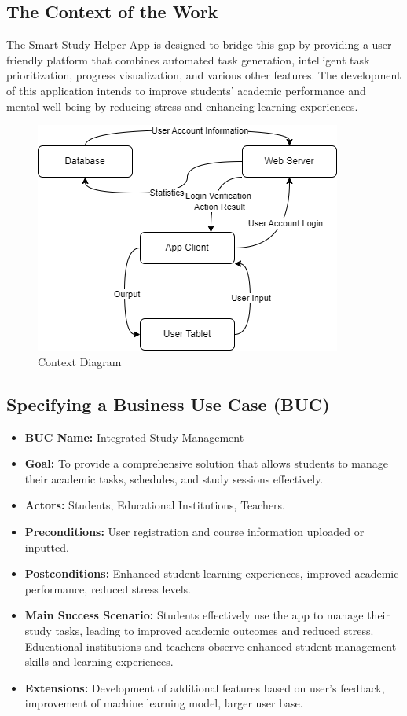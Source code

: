 \documentclass[12pt]{article}
\begin{document}
\subsection{The Context of the Work}
The Smart Study Helper App is designed to bridge this gap by providing a user-friendly platform that combines automated task generation, intelligent task prioritization, progress visualization, and various other features. The development of this application intends to improve students' academic performance and mental well-being by reducing stress and enhancing learning experiences.
\begin{figure}[htbp]
    \centering
    \includegraphics[width=0.7\linewidth]{Context Diagram.drawio.png} 
    \caption{Context Diagram}
    \label{fig:samplelabel}
\end{figure}

\subsection{Specifying a Business Use Case (BUC)}
\begin{itemize}
    \item \textbf{BUC Name:} Integrated Study Management
    \item \textbf{Goal:} To provide a comprehensive solution that allows students to manage their academic tasks, schedules, and study sessions effectively.
    \item \textbf{Actors:} Students, Educational Institutions, Teachers.
    \item \textbf{Preconditions:} User registration and course information uploaded or inputted.
    \item \textbf{Postconditions:} Enhanced student learning experiences, improved academic performance, reduced stress levels.
    \item \textbf{Main Success Scenario:} Students effectively use the app to manage their study tasks, leading to improved academic outcomes and reduced stress. Educational institutions and teachers observe enhanced student management skills and learning experiences.
    \item \textbf{Extensions:} Development of additional features based on user's feedback, improvement of machine learning model, larger user base.
\end{itemize}
\end{document}
